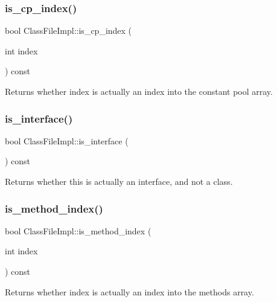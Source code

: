 \subsubsection{\texorpdfstring{is\+\_\+cp\+\_\+index()}{is\_cp\_index()}}
{\footnotesize\ttfamily bool Class\+File\+Impl\+::is\+\_\+cp\+\_\+index (\begin{DoxyParamCaption}\item[{int}]{index }\end{DoxyParamCaption}) const}

Returns whether {\ttfamily index} is actually an index into the constant pool array. \mbox{\label{classClassFileImpl_ade64e9cb17003aa71ef596785ab8c575}} 
\subsubsection{\texorpdfstring{is\+\_\+interface()}{is\_interface()}}
{\footnotesize\ttfamily bool Class\+File\+Impl\+::is\+\_\+interface (\begin{DoxyParamCaption}{ }\end{DoxyParamCaption}) const}



Returns whether this is actually an interface, and not a class. 

\mbox{\label{classClassFileImpl_ad8f4fcb051aa9d8c04d67373abe12c43}} 
\subsubsection{\texorpdfstring{is\+\_\+method\+\_\+index()}{is\_method\_index()}}
{\footnotesize\ttfamily bool Class\+File\+Impl\+::is\+\_\+method\+\_\+index (\begin{DoxyParamCaption}\item[{int}]{index }\end{DoxyParamCaption}) const}



Returns whether {\ttfamily index} is actually an index into the methods array. 

